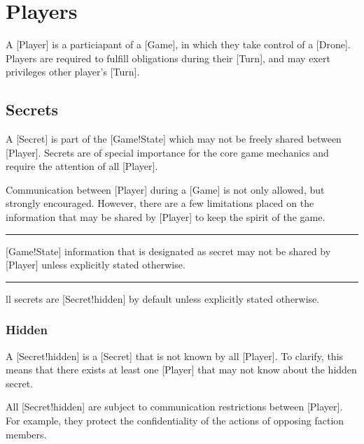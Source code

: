 \chapter{Players}

A [Player] is a particiapant of a [Game], in which they take control of a [Drone].
Players are required to fulfill obligations during their [Turn], and may exert privileges other player's [Turn].

\section{Secrets}

A [Secret] is part of the [Game!State] which may not be freely shared between [Player].
Secrets are of special importance for the core game mechanics and require the attention of all [Player].

Communication between [Player] during a [Game] is not only allowed, but strongly encouraged.
However, there are a few limitations placed on the information that may be shared by [Player] to keep the spirit of the game.

\begin{rules}
    \rule{player.secret} [Game!State] information that is designated as secret may not be shared by [Player] unless explicitly stated otherwise.
    \rule{player.secret.init} All secrets are [Secret!hidden] by default unless explicitly stated otherwise.
\end{rules}

\subsection{Hidden}

A [Secret!hidden] is a [Secret] that is not known by all [Player].
To clarify, this means that there exists at least one [Player] that may not know about the hidden secret.

All [Secret!hidden] are subject to communication restrictions between [Player].
For example, they protect the confidentiality of the actions of opposing faction members.

